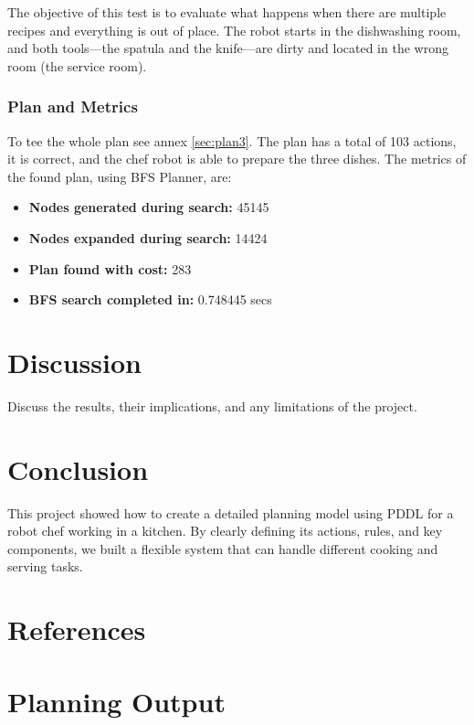 \documentclass[a4paper,12pt]{article}
\begin{document}
The objective of this test is to evaluate what happens when there are multiple recipes and everything is out of place. The robot starts in the dishwashing room, and both tools—the spatula and the knife—are dirty and located in the wrong room (the service room).

\subsubsection{Plan and Metrics}
To tee the whole plan see annex \ref{sec:plan3}. The plan has a total of 103 actions, it is correct, and the chef robot is able to prepare the three dishes. The metrics of the found plan, using BFS Planner, are:

\begin{itemize}
    \item \textbf{Nodes generated during search:} 45145
    \item \textbf{Nodes expanded during search:} 14424
    \item \textbf{Plan found with cost:} 283
    \item \textbf{BFS search completed in:} 0.748445 secs
\end{itemize}


\section{Discussion}
\label{sec:discussion}
Discuss the results, their implications, and any limitations of the project.

\section{Conclusion}
\label{sec:conclusion}
This project showed how to create a detailed planning model using PDDL for a robot chef working in a kitchen. By clearly defining its actions, rules, and key components, we built a flexible system that can handle different cooking and serving tasks. 

\section{References}
\label{sec:references}



\appendix
\section{Planning Output}
\end{document}
